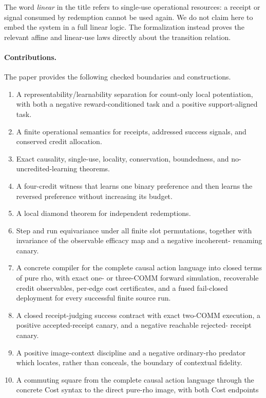 \documentclass[11pt]{article}
\begin{document}
The word \emph{linear} in the title refers to single-use operational
resources: a receipt or signal consumed by redemption cannot be used again.
We do not claim here to embed the system in a full linear logic.  The
formalization instead proves the relevant affine and linear-use laws directly
about the transition relation.

\paragraph{Contributions.}
The paper provides the following checked boundaries and constructions.

\begin{enumerate}
\item A representability/learnability separation for count-only local
  potentiation, with both a negative reward-conditioned task and a positive
  support-aligned task.
\item A finite operational semantics for receipts, addressed success signals,
  and conserved credit allocation.
\item Exact causality, single-use, locality, conservation, boundedness, and
  no-uncredited-learning theorems.
\item A four-credit witness that learns one binary preference and then learns
  the reversed preference without increasing its budget.
\item A local diamond theorem for independent redemptions.
\item Step and run equivariance under all finite slot permutations, together
  with invariance of the observable efficacy map and a negative incoherent-
  renaming canary.
\item A concrete compiler for the complete causal action language into closed
  terms of pure rho, with exact one- or three-COMM forward simulation,
  recoverable credit observables, per-edge cost certificates, and a fused
  fail-closed deployment for every successful finite source run.
\item A closed receipt-judging success contract with exact two-COMM execution,
  a positive accepted-receipt canary, and a negative reachable rejected-
  receipt canary.
\item A positive image-context discipline and a negative ordinary-rho predator
  which locates, rather than conceals, the boundary of contextual fidelity.
\item A commuting square from the complete causal action language through the
  concrete Cost syntax to the direct pure-rho image, with both Cost endpoints

\end{enumerate}
\end{document}

